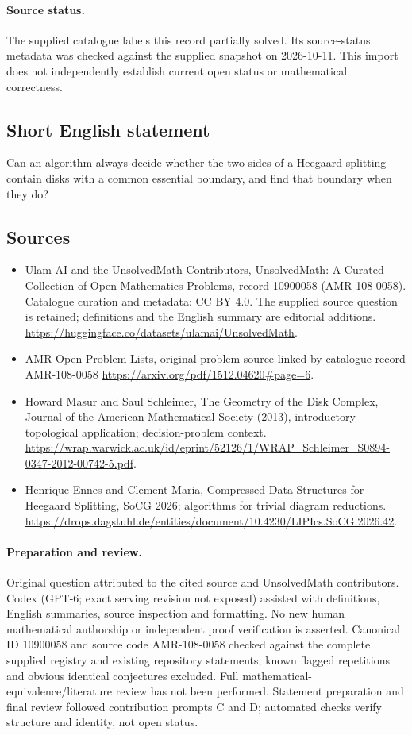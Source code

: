 \documentclass[11pt]{article}
\begin{document}
\paragraph{Source status.}
The supplied catalogue labels this record partially solved. Its source-status metadata was checked against the supplied snapshot on 2026-10-11. This import does not independently establish current open status or mathematical correctness.
\subsection{Short English statement}
Can an algorithm always decide whether the two sides of a Heegaard splitting contain disks with a common essential boundary, and find that boundary when they do?
\subsection{Sources}
\begin{itemize}
\item[\hypertarget{source:10900058:1}{S1}] Ulam AI and the UnsolvedMath Contributors, UnsolvedMath: A Curated Collection of Open Mathematics Problems, record 10900058 (AMR-108-0058). Catalogue curation and metadata: CC BY 4.0. The supplied source question is retained; definitions and the English summary are editorial additions.
\url{https://huggingface.co/datasets/ulamai/UnsolvedMath}.
\item[\hypertarget{source:10900058:2}{S2}] AMR Open Problem Lists, original problem source linked by catalogue record AMR-108-0058
\url{https://arxiv.org/pdf/1512.04620#page=6}.
\item[\hypertarget{source:10900058:3}{S3}] Howard Masur and Saul Schleimer, The Geometry of the Disk Complex, Journal of the American Mathematical Society (2013), introductory topological application; decision-problem context.
\url{https://wrap.warwick.ac.uk/id/eprint/52126/1/WRAP_Schleimer_S0894-0347-2012-00742-5.pdf}.
\item[\hypertarget{source:10900058:4}{S4}] Henrique Ennes and Clement Maria, Compressed Data Structures for Heegaard Splitting, SoCG 2026; algorithms for trivial diagram reductions.
\url{https://drops.dagstuhl.de/entities/document/10.4230/LIPIcs.SoCG.2026.42}.
\end{itemize}
\paragraph{Preparation and review.}
Original question attributed to the cited source and UnsolvedMath contributors. Codex (GPT-6; exact serving revision not exposed) assisted with definitions, English summaries, source inspection and formatting. No new human mathematical authorship or independent proof verification is asserted. Canonical ID 10900058 and source code AMR-108-0058 checked against the complete supplied registry and existing repository statements; known flagged repetitions and obvious identical conjectures excluded. Full mathematical-equivalence/literature review has not been performed. Statement preparation and final review followed contribution prompts C and D; automated checks verify structure and identity, not open status.
\label{end:10900058}
\end{document}
